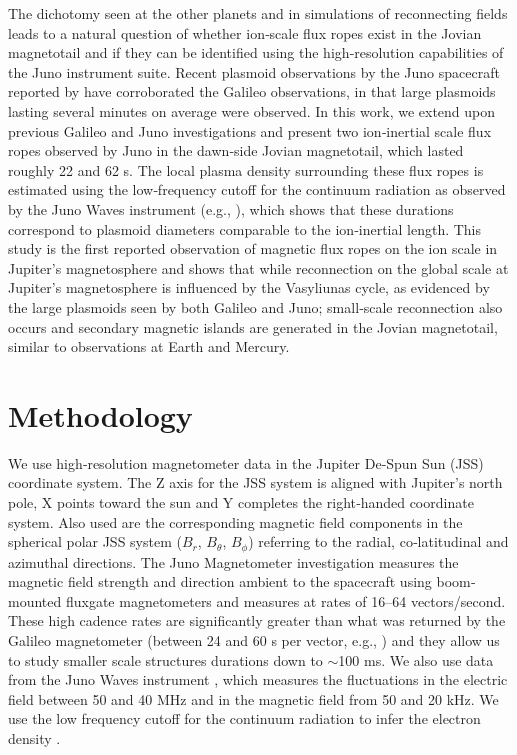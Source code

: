 The dichotomy seen at the other planets and in simulations of reconnecting fields leads to a natural question of whether ion‐scale flux ropes exist in the Jovian magnetotail and if they can be identified using the high‐resolution capabilities of the Juno instrument suite. Recent plasmoid observations by the Juno spacecraft reported by \cite{Vogt2020MagnetotailObservations} have corroborated the Galileo observations, in that large plasmoids lasting several minutes on average were observed. In this work, we extend upon previous Galileo and Juno investigations and present two ion‐inertial scale flux ropes observed by Juno in the dawn‐side Jovian magnetotail, which lasted roughly 22 and 62 s. The local plasma density surrounding these flux ropes is estimated using the low‐frequency cutoff for the continuum radiation as observed by the Juno Waves instrument (e.g., ), which shows that these durations correspond to plasmoid diameters comparable to the ion‐inertial length. This study is the first reported observation of magnetic flux ropes on the ion scale in Jupiter's magnetosphere and shows that while reconnection on the global scale at Jupiter's magnetosphere is influenced by the Vasyliunas cycle, as evidenced by the large plasmoids seen by both Galileo and Juno; small‐scale reconnection also occurs and secondary magnetic islands are generated in the Jovian magnetotail, similar to observations at Earth and Mercury. 

\section{Methodology}
We use high‐resolution magnetometer data in the Jupiter De‐Spun Sun (JSS) coordinate system. The Z axis for the JSS system is aligned with Jupiter's north pole, X points toward the sun and Y completes the right‐handed coordinate system. Also used are the corresponding magnetic field components in the spherical polar JSS system ($B_r$, $B_\theta$, $B_\phi$) referring to the radial, co‐latitudinal and azimuthal directions. The Juno Magnetometer investigation measures the magnetic field strength and direction ambient to the spacecraft using boom‐mounted fluxgate magnetometers \cite{Connerney2017TheInvestigation} and measures at rates of 16–64 vectors/second. These high cadence rates are significantly greater than what was returned by the Galileo magnetometer (between 24 and 60 s per vector, e.g., ) and they allow us to study smaller scale structures durations down to $\sim$100 ms. We also use data from the Juno Waves instrument \cite{Kurth2017TheInvestigation}, which measures the fluctuations in the electric field between 50 and 40 MHz and in the magnetic field from 50 and 20 kHz. We use the low frequency cutoff for the continuum radiation to infer the electron density \cite{Barnhart2009ElectronSpectra}.

